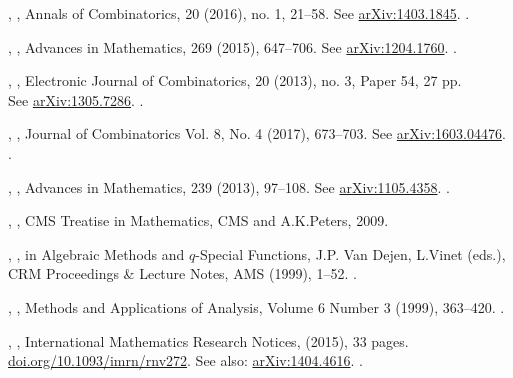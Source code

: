 \documentclass[12pt]{amsart}
\theoremstyle{plain}
\theoremstyle{definition}
\theoremstyle{remark}
\begin{document}
\renewcommand{\refname}{{References}}
\begin{thebibliography}{10}  

,
,
Annals of Combinatorics, 20 (2016), no. 1, 21--58. 
See \href{http://arxiv.org/abs/1403.1845}{arXiv:1403.1845}. . 
 
,
,
Advances in Mathematics, 269 (2015), 647--706. 
See \href{http://arxiv.org/abs/1204.1760}{arXiv:1204.1760}. .

,
,
Electronic Journal of Combinatorics,  20 (2013), no. 3, Paper 54, 27 pp. \\
   See \href{http://arxiv.org/abs/1305.7286}{arXiv:1305.7286}. .

,
,  
Journal of Combinatorics  Vol. 8, No. 4 (2017),   673--703. 
See \href{http://arxiv.org/abs/1603.04476}{arXiv:1603.04476}. .


,
, 
Advances in Mathematics, 239 (2013), 97--108. 
See \href{http://arxiv.org/abs/1105.4358}{arXiv:1105.4358}. .

,
, 
CMS Treatise in Mathematics, CMS and A.K.Peters,  2009.

,
, 
in Algebraic Methods and $q$-Special Functions, J.P. Van Dejen, L.Vinet (eds.), 
CRM Proceedings \& Lecture Notes, AMS (1999), 1--52. .

,
,
Methods and Applications of Analysis, 
 Volume 6 Number 3 (1999), 363--420. .

,
,
International Mathematics Research Notices, (2015), 33 pages.
\href{https://doi.org/10.1093/imrn/rnv272}{doi.org/10.1093/imrn/rnv272}. See also:
\href{http://arxiv.org/abs/1404.4616}{arXiv:1404.4616}.  .



\end{thebibliography}
\end{document}
